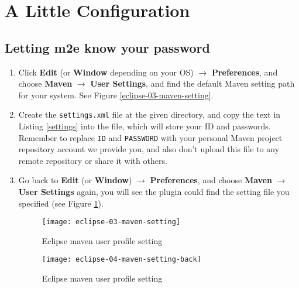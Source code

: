 
\section{A Little Configuration}

\subsection{Letting m2e know your password}

\begin{enumerate}

\item Click \textbf{Edit} (or \textbf{Window} depending on your OS)
$\rightarrow$ \textbf{Preferences}, and choose \textbf{Maven} $\rightarrow$
\textbf{User Settings}, and find the default Maven setting path for your system.
See Figure \ref{eclipse-03-maven-setting}.

\item Create the \verb|settings.xml| file at the given directory, and copy the
text in Listing \ref{settings} into the file, which will store your ID and
passwords. Remember to replace \verb|ID| and \verb|PASSWORD| with your personal
Maven project repository account we provide you, and also don't upload this file
to any remote repository or share it with others.

\item Go back to \textbf{Edit} (or \textbf{Window}) $\rightarrow$
\textbf{Preferences}, and choose \textbf{Maven} $\rightarrow$ \textbf{User
Settings} again, you will see the plugin could find the setting file you
specified (see Figure \ref{eclipse-04-maven-setting-back}).

\begin{figure}[t]
\hspace{-3em}
\begin{minipage}{0.5\textwidth}
\centering
\texttt{[image: eclipse-03-maven-setting]}
\caption{Eclipse maven user profile setting\label{eclipse-03-maven-setting}}
\end{minipage}
\hfill
\begin{minipage}{0.5\textwidth}
\centering
\texttt{[image: eclipse-04-maven-setting-back]}
\caption{Eclipse maven user profile setting\label{eclipse-04-maven-setting-back}}
\end{minipage}
\hspace{-3em}
\end{figure}



\end{enumerate}

